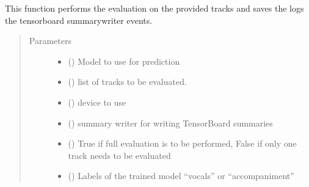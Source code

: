 \documentclass[letterpaper,10pt,english,openany,oneside]{sphinxmanual}
\begin{document}
\begin{fulllineitems}
\label{\detokenize{docs/source/train:train.train_model.evaluation}}
This function performs the evaluation on the provided tracks and saves the logs the tensorboard summarywriter events.
\begin{quote}\begin{description}
\item[{Parameters}] \leavevmode\begin{itemize}
\item {} 
 ({\hyperref[\detokenize{docs/source/train:train.model.Generalised_Recurrent_Model}]{}}) \textendash{} Model to use for prediction

\item {} 
 (\sphinxstyleliteralemphasis{\sphinxupquote{{[}}}{\hyperref[\detokenize{docs/source/application.model:application.model.Track}]{\sphinxcrossref{\sphinxstyleliteralemphasis{\sphinxupquote{Track}}}}}\sphinxstyleliteralemphasis{\sphinxupquote{{]}}}) \textendash{} list of tracks to be evaluated.

\item {} 
 () \textendash{} device to use

\item {} 
 () \textendash{} summary writer for writing TensorBoard summaries

\item {} 
 () \textendash{} True if full evaluation is to be performed, False if only one track needs to be evaluated

\item {} 
 () \textendash{} Labels of the trained model “vocals” or “accompaniment”

\end{itemize}

\end{description}\end{quote}

\end{fulllineitems}
\end{document}
